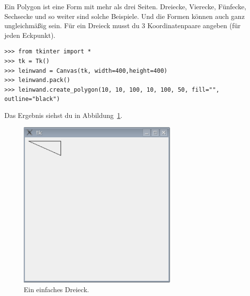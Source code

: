 Ein Polygon ist eine Form mit mehr als drei Seiten. Dreiecke, Vierecke, Fünfecke, Sechsecke und so weiter sind solche Beispiele. Und die Formen können auch ganz ungleichmäßig sein. Für ein Dreieck musst du 3 Koordinatenpaare angeben (für jeden Eckpunkt). 

\begin{Verbatim}[frame=single]
>>> from tkinter import *
>>> tk = Tk()
>>> leinwand = Canvas(tk, width=400,height=400)
>>> leinwand.pack()
>>> leinwand.create_polygon(10, 10, 100, 10, 100, 50, fill="", outline="black")
\end{Verbatim}

Das Ergebnis siehst du in Abbildung~\ref{fig41}.

\begin{figure}
\begin{center}
\includegraphics[width=80mm]{images/figure41}
\end{center}
\caption{Ein einfaches Dreieck.}\label{fig41}
\end{figure}

